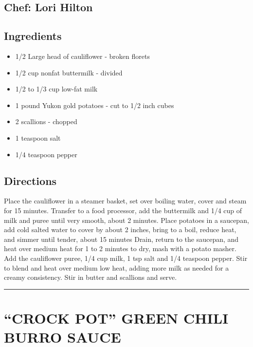 \documentclass[
]{book}
\providecommand{\tightlist}{%
  \setlength{\itemsep}{0pt}\setlength{\parskip}{0pt}}
\begin{document}
\hypertarget{chef-lori-hilton-2}{%
\subsection*{Chef: Lori Hilton}\label{chef-lori-hilton-2}}


\hypertarget{ingredients-28}{%
\subsection*{Ingredients}\label{ingredients-28}}


\begin{itemize}
\tightlist
\item
  1/2 Large head of cauliflower - broken florets
\item
  1/2 cup nonfat buttermilk - divided
\item
  1/2 to 1/3 cup low-fat milk
\item
  1 pound Yukon gold potatoes - cut to 1/2 inch cubes
\item
  2 scallions - chopped
\item
  1 teaspoon salt
\item
  1/4 teaspoon pepper
\end{itemize}

\hypertarget{directions-28}{%
\subsection*{Directions}\label{directions-28}}


Place the cauliflower in a steamer basket, set over boiling water, cover and steam for 15 minutes. Transfer to a food processor, add the buttermilk and 1/4 cup of milk and puree until very smooth, about 2 minutes. Place potatoes in a saucepan, add cold salted water to cover by about 2 inches, bring to a boil, reduce heat, and simmer until tender, about 15 minutes Drain, return to the saucepan, and heat over medium heat for 1 to 2 minutes to dry, mash with a potato masher. Add the cauliflower puree, 1/4 cup milk, 1 tsp salt and 1/4 teaspoon pepper. Stir to blend and heat over medium low heat, adding more milk as needed for a creamy consistency. Stir in butter and scallions and serve.

\begin{center}\rule{0.5\linewidth}{0.5pt}\end{center}

\hypertarget{crock-pot-green-chili-burro-sauce}{%
\section*{``CROCK POT'' GREEN CHILI BURRO SAUCE}\label{crock-pot-green-chili-burro-sauce}}
\end{document}

